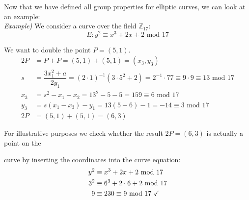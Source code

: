 \documentclass[11pt, a4paper]{article}
\newcommand{\mymod}{
    \text{ mod }
}
\begin{document}
\newpage
\hfill\break
Now that we have defined all group properties for elliptic curves, we can look at an example:\\

\textit{Example)} We consider a curve over the field $\mathbb{Z}_{17}$:
$$E:y^2\equiv x^3+2x+2\mymod 17$$

We want to double the point $P=(5,1)$.
\begin{align*}
    2P&=P+P=(5,1)+(5,1)=(x_3,y_3)\\
    s&=\dfrac{3x_1^2+a}{2y_1}=(2\cdot1)^{-1}(3\cdot5^2+2)=2^{-1}\cdot77\equiv9\cdot9\equiv13\mymod 17\\
    x_3&=s^2-x_1-x_2=13^2-5-5=159\equiv6\mymod17\\
    y_3&=s(x_1-x_3)-y_1=13(5-6)-1=-14\equiv3\mymod17\\
    2P&=(5,1)+(5,1)=(6,3)
\end{align*}

For illustrative purposes we check whether the result $2P=(6,3)$ is actually a point on the

curve by inserting the coordinates into the curve equation:
\begin{align*}
    y^2&\equiv x^3+2x+2\mymod17\\
    3^2&\equiv6^3+2\cdot6+2\mymod17\\
    9&\equiv230\equiv9\mymod 17 \text{ \checkmark}
\end{align*}
\end{document}
